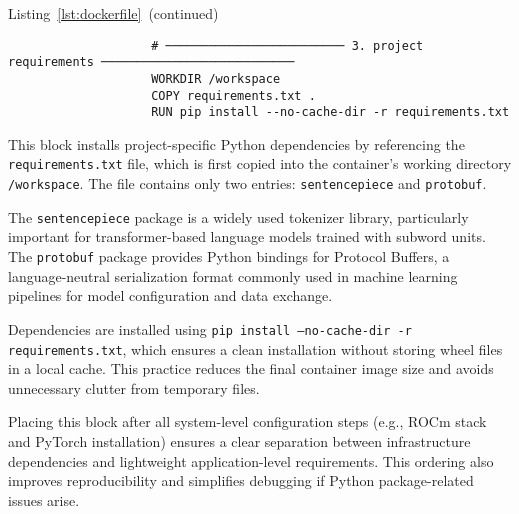 \vspace{1em}

\begin{minipage}{\textwidth}
	\captionsetup{type=listing}
	\caption*{Listing~\ref{lst:dockerfile}~(continued)}

	\begin{verbatim}
                    # ───────────────────────── 3. project requirements ───────────────────────────
                    WORKDIR /workspace
                    COPY requirements.txt .
                    RUN pip install --no-cache-dir -r requirements.txt

    \end{verbatim}
\end{minipage}

This block installs project-specific Python dependencies by referencing the \texttt{requirements.txt} file, which is first copied into the container’s working directory \texttt{/workspace}. The file contains only two entries: \texttt{sentencepiece} and \texttt{protobuf}.

The \texttt{sentencepiece} package is a widely used tokenizer library, particularly important for transformer-based language models trained with subword units. The \texttt{protobuf} package provides Python bindings for Protocol Buffers, a language-neutral serialization format commonly used in machine learning pipelines for model configuration and data exchange.

Dependencies are installed using \texttt{pip install --no-cache-dir -r requirements.txt}, which ensures a clean installation without storing wheel files in a local cache. This practice reduces the final container image size and avoids unnecessary clutter from temporary files.

Placing this block after all system-level configuration steps (e.g., ROCm stack and PyTorch installation) ensures a clear separation between infrastructure dependencies and lightweight application-level requirements. This ordering also improves reproducibility and simplifies debugging if Python package-related issues arise.

\vspace{1em}

